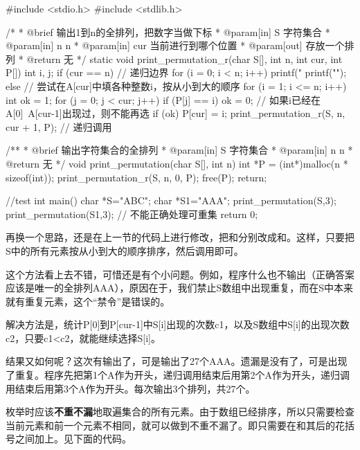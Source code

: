 \begin{Code}
#include <stdio.h>
#include <stdlib.h>

/*
 * @brief 输出1到n的全排列，把数字当做下标
 * @param[in] S 字符集合
 * @param[in] n n
 * @param[in] cur 当前进行到哪个位置
 * @param[out] 存放一个排列
 * @return 无
 */
static void print_permutation_r(char S[], int n, int cur, int P[]) {
    int i, j;
    if (cur == n) { // 递归边界
        for (i = 0; i < n; i++)
            printf("%
        printf("\n");
    } else {
        // 尝试在A[cur]中填各种整数i，按从小到大的顺序
        for (i = 1; i <= n; i++) {
            int ok = 1;
            for (j = 0; j < cur; j++)
                if (P[j] == i)
                    ok = 0; // 如果i已经在A[0]~A[cur-1]出现过，则不能再选
            if (ok) {
                P[cur] = i;
                print_permutation_r(S, n, cur + 1, P); // 递归调用
            }
        }
    }
}

/**
 * @brief 输出字符集合的全排列
 * @param[in] S 字符集合
 * @param[in] n n
 * @return 无
 */
void print_permutation(char S[], int n) {
    int *P = (int*)malloc(n * sizeof(int));
    print_permutation_r(S, n, 0, P);
    free(P);
    return;
}

//test
int main() {
    char *S="ABC";
    char *S1="AAA";
    print_permutation(S,3);
    print_permutation(S1,3); // 不能正确处理可重集
    return 0;
}
\end{Code}

再换一个思路，还是在上一节的代码上进行修改，把和分别改成和。这样，只要把S中的所有元素按从小到大的顺序排序，然后调用即可。

这个方法看上去不错，可惜还是有个小问题。例如，程序什么也不输出（正确答案应该是唯一的全排列AAA），原因在于，我们禁止S数组中出现重复，而在S中本来就有重复元素，这个“禁令”是错误的。

解决方法是，统计P[0]到P[cur-1]中S[i]出现的次数c1，以及S数组中S[i]的出现次数c2，只要c1<c2，就能继续选择S[i]。

结果又如何呢？这次有输出了，可是输出了27个AAA。遗漏是没有了，可是出现了重复。程序先把第1个A作为开头，递归调用结束后用第2个A作为开头，递归调用结束后用第3个A作为开头。每次输出3个排列，共27个。

枚举时应该\textbf{不重不漏}地取遍集合的所有元素。由于数组已经排序，所以只需要检查当前元素和前一个元素不相同，就可以做到不重不漏了。即只需要在和其后的花括号之间加上。见下面的代码。

